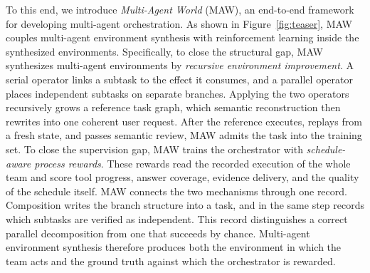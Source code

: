 To this end, we introduce \emph{Multi-Agent World} (MAW), an end-to-end framework for developing multi-agent orchestration.
As shown in Figure~\ref{fig:teaser}, MAW couples multi-agent environment synthesis with reinforcement learning inside the synthesized environments.
Specifically, to close the structural gap, MAW synthesizes multi-agent environments by \emph{recursive environment improvement}.
A serial operator links a subtask to the effect it consumes, and a parallel operator places independent subtasks on separate branches.
Applying the two operators recursively grows a reference task graph, which semantic reconstruction then rewrites into one coherent user request.
After the reference executes, replays from a fresh state, and passes semantic review, MAW admits the task into the training set.
To close the supervision gap, MAW trains the orchestrator with \emph{schedule-aware process rewards}.
These rewards read the recorded execution of the whole team and score tool progress, answer coverage, evidence delivery, and the quality of the schedule itself.
MAW connects the two mechanisms through one record.
Composition writes the branch structure into a task, and in the same step records which subtasks are verified as independent.
This record distinguishes a correct parallel decomposition from one that succeeds by chance.
Multi-agent environment synthesis therefore produces both the environment in which the team acts and the ground truth against which the orchestrator is rewarded.

